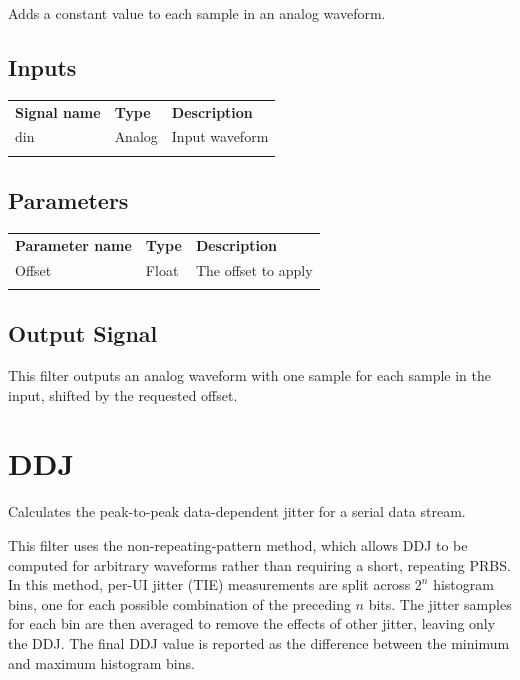 Adds a constant value to each sample in an analog waveform.

\subsection{Inputs}

\begin{tabularx}{16cm}{llX}
\thickhline
\textbf{Signal name} & \textbf{Type} & \textbf{Description} \\
\thickhline
din & Analog & Input waveform \\
\thickhline
\end{tabularx}

\subsection{Parameters}

\begin{tabularx}{16cm}{llX}
\thickhline
\textbf{Parameter name} & \textbf{Type} & \textbf{Description} \\
\thickhline
Offset & Float & The offset to apply \\
\thickhline
\end{tabularx}

\subsection{Output Signal}

This filter outputs an analog waveform with one sample for each sample in the input, shifted by the requested offset.

\pagebreak
\section{DDJ}
\label{filter:ddj}

Calculates the peak-to-peak data-dependent jitter for a serial data stream.

This filter uses the non-repeating-pattern method, which allows DDJ to be computed for arbitrary waveforms rather than
requiring a short, repeating PRBS. In this method, per-UI jitter (TIE) measurements are split across $2^n$ histogram
bins, one for each possible combination of the preceding $n$ bits. The jitter samples for each bin are then averaged to
remove the effects of other jitter, leaving only the DDJ.  The final DDJ value is reported as the difference between
the minimum and maximum histogram bins.

